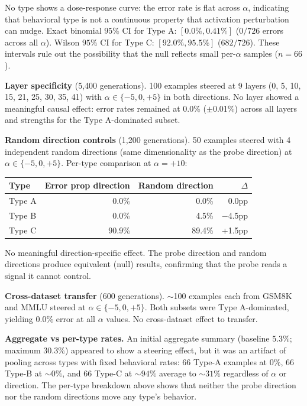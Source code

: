 \documentclass[10pt]{article} %
\begin{document}
\noindent No type shows a dose-response curve: the error rate is flat across $\alpha$, indicating that behavioral type is not a continuous property that activation perturbation can nudge. Exact binomial $95\%$ CI for Type A: $[0.0\%, 0.41\%]$ ($0/726$ errors across all $\alpha$). Wilson $95\%$ CI for Type C: $[92.0\%, 95.5\%]$ ($682/726$). These intervals rule out the possibility that the null reflects small per-$\alpha$ samples ($n = 66$).

\textbf{Layer specificity} (5,400 generations). 100 examples steered at 9 layers (0, 5, 10, 15, 21, 25, 30, 35, 41) with $\alpha \in \{-5, 0, +5\}$ in both directions. No layer showed a meaningful causal effect: error rates remained at 0.0\% ($\pm$0.01\%) across all layers and strengths for the Type A-dominated subset.

\textbf{Random direction controls} (1,200 generations). 50 examples steered with 4 independent random directions (same dimensionality as the probe direction) at $\alpha \in \{-5, 0, +5\}$. Per-type comparison at $\alpha = +10$:

\begin{center}
\scriptsize
\begin{tabular}{lrrr}
\toprule
\textbf{Type} & \textbf{Error prop direction} & \textbf{Random direction} & \textbf{$\Delta$} \\
\midrule
Type A & 0.0\% & 0.0\% & 0.0pp \\
Type B & 0.0\% & 4.5\% & $-$4.5pp \\
Type C & 90.9\% & 89.4\% & +1.5pp \\
\bottomrule
\end{tabular}
\end{center}

\noindent No meaningful direction-specific effect. The probe direction and random directions produce equivalent (null) results, confirming that the probe reads a signal it cannot control.

\textbf{Cross-dataset transfer} (600 generations). $\sim$100 examples each from GSM8K and MMLU steered at $\alpha \in \{-5, 0, +5\}$. Both subsets were Type A-dominated, yielding 0.0\% error at all $\alpha$ values. No cross-dataset effect to transfer.

\textbf{Aggregate vs per-type rates.} An initial aggregate summary (baseline $5.3\%$; maximum $30.3\%$) appeared to show a steering effect, but it was an artifact of pooling across types with fixed behavioral rates: $66$ Type-A examples at $0\%$, $66$ Type-B at $\sim$$0\%$, and $66$ Type-C at $\sim$$94\%$ average to $\sim$$31\%$ regardless of $\alpha$ or direction. The per-type breakdown above shows that neither the probe direction nor the random directions move any type's behavior.
\end{document}

